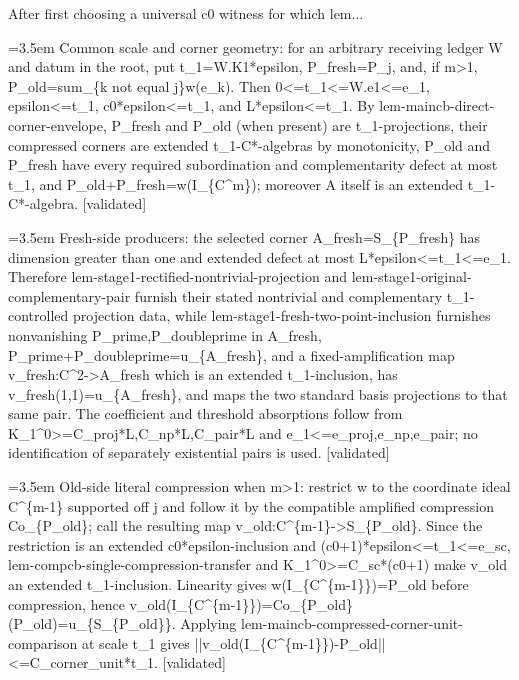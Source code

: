 \documentclass{article}
\newcommand{\step}[1]{\par\noindent\hangindent=3.5em\hangafter=1%
  \makebox[3.5em][l]{\textbf{#1.}}}
\newcommand{\steptag}[1]{\hfill{\small\textsf{[#1]}}}
\begin{document}
\begin{proofbox}{After first choosing a universal c0 witness for which lem...}
\step{1.2} Common scale and corner geometry: for an arbitrary receiving ledger W and datum in the root, put t\_1=W.K1*epsilon, P\_fresh=P\_j, and, if m>1, P\_old=sum\_\{k not equal j\}w(e\_k). Then 0<=t\_1<=W.e1<=e\_1, epsilon<=t\_1, c0*epsilon<=t\_1, and L*epsilon<=t\_1. By lem-maincb-direct-corner-envelope, P\_fresh and P\_old (when present) are t\_1-projections, their compressed corners are extended t\_1-C*-algebras by monotonicity, P\_old and P\_fresh have every required subordination and complementarity defect at most t\_1, and P\_old+P\_fresh=w(I\_\{C\textasciicircum{}m\}); moreover A itself is an extended t\_1-C*-algebra. \steptag{validated} \\[4pt]
\step{1.3} Fresh-side producers: the selected corner A\_fresh=S\_\{P\_fresh\} has dimension greater than one and extended defect at most L*epsilon<=t\_1<=e\_1. Therefore lem-stage1-rectified-nontrivial-projection and lem-stage1-original-complementary-pair furnish their stated nontrivial and complementary t\_1-controlled projection data, while lem-stage1-fresh-two-point-inclusion furnishes nonvanishing P\_prime,P\_doubleprime in A\_fresh, P\_prime+P\_doubleprime=u\_\{A\_fresh\}, and a fixed-amplification map v\_fresh:C\textasciicircum{}2->A\_fresh which is an extended t\_1-inclusion, has v\_fresh(1,1)=u\_\{A\_fresh\}, and maps the two standard basis projections to that same pair. The coefficient and threshold absorptions follow from K\_1\textasciicircum{}0>=C\_proj*L,C\_np*L,C\_pair*L and e\_1<=e\_proj,e\_np,e\_pair; no identification of separately existential pairs is used. \steptag{validated} \\[4pt]
\step{1.4} Old-side literal compression when m>1: restrict w to the coordinate ideal C\textasciicircum{}\{m-1\} supported off j and follow it by the compatible amplified compression Co\_\{P\_old\}; call the resulting map v\_old:C\textasciicircum{}\{m-1\}->S\_\{P\_old\}. Since the restriction is an extended c0*epsilon-inclusion and (c0+1)*epsilon<=t\_1<=e\_sc, lem-compcb-single-compression-transfer and K\_1\textasciicircum{}0>=C\_sc*(c0+1) make v\_old an extended t\_1-inclusion. Linearity gives w(I\_\{C\textasciicircum{}\{m-1\}\})=P\_old before compression, hence v\_old(I\_\{C\textasciicircum{}\{m-1\}\})=Co\_\{P\_old\}(P\_old)=u\_\{S\_\{P\_old\}\}. Applying lem-maincb-compressed-corner-unit-comparison at scale t\_1 gives ||v\_old(I\_\{C\textasciicircum{}\{m-1\}\})-P\_old||<=C\_corner\_unit*t\_1. \steptag{validated} \\[4pt]

\end{proofbox}
\end{document}
